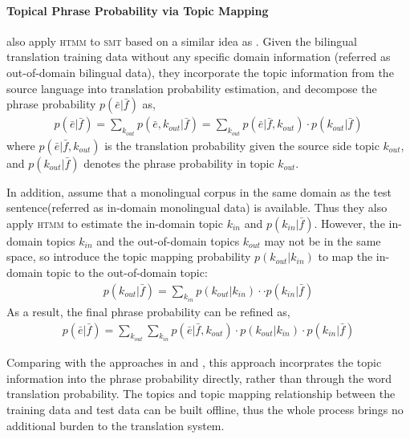 
\paragraph{Topical Phrase Probability via Topic Mapping}

\citet{su-12} also apply \textsc{htmm} to \textsc{smt} based on a
similar idea as \citet{Eidelman-12}. Given the bilingual translation
training data without any specific domain information (referred as
out-of-domain bilingual data), they incorporate the topic information
from the source language into translation probability estimation, and
decompose the phrase probability $p(\bar{e}|\bar{f})$ as,
\begin{align}
p(\bar{e}|\bar{f}) = \sum_{k_{out}} p(\bar{e}, k_{out} | \bar{f}) = \sum_{k_{out}} p(\bar{e} | \bar{f}, k_{out}) \cdot p(k_{out} | \bar{f})
\end{align}
where $p(\bar{e} | \bar{f}, k_{out})$ is the translation probability given the source side topic $k_{out}$, and $p(k_{out} | \bar{f})$ denotes the phrase probability in topic $k_{out}$.

In addition, \citet{su-12} assume that a monolingual corpus in the
same domain as the test sentence(referred as in-domain monolingual
data) is available. Thus they also apply \textsc{htmm} to estimate the
in-domain topic $k_{in}$ and $p(k_{in} | \bar{f})$.  However, the
in-domain topics $k_{in}$ and the out-of-domain topics $k_{out}$ may
not be in the same space, so \citet{su-12} introduce the topic mapping
probability $p(k_{out} | k_{in})$ to map the in-domain topic to the
out-of-domain topic:
\begin{align}
p(k_{out} | \bar{f}) = \sum_{k_{in}} p(k_{out} | k_{in}) \cdot \cdot p(k_{in} | \bar{f})
\end{align}
As a result, the final phrase probability can be refined as,
\begin{align}
p(\bar{e}|\bar{f}) = \sum_{k_{out}} \sum_{k_{in}} p(\bar{e} | \bar{f}, k_{out}) \cdot p(k_{out} | k_{in}) \cdot p(k_{in} | \bar{f})
\end{align}

Comparing with the approaches in \citet{Eidelman-12} and
\citet{hasler-12}, this approach incorprates the topic information
into the phrase probability directly, rather than through the word
translation probability. The topics and topic mapping relationship
between the training data and test data can be built offline, thus the
whole process brings no additional burden to the translation system.

